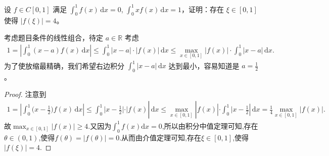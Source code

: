 \documentclass[../../main.tex]{subfiles}%
\begin{document}
\begin{example}
设 $f \in C[0,1]$ 满足 $\int_0^1 f(x) \, \mathrm{d}x = 0$, $\int_0^1 xf(x) \, \mathrm{d}x = 1$，证明：存在 $\xi \in [0,1]$ 使得 $|f(\xi)| = 4$。
\end{example}
\begin{note}
考虑题目条件的线性组合，待定 $a \in \mathbb{R}$ 考虑
\begin{align*}
1 = \left| \int_0^1 (x - a)f(x) \, \mathrm{d}x \right| \leqslant  \int_0^1 |x - a| \cdot |f(x)| \, \mathrm{d}x \leqslant  \max_{x \in [0,1]} |f(x)| \cdot \int_0^1 |x - a| \, \mathrm{d}x.
\end{align*}
为了使放缩最精确，我们希望右边积分 $\int_0^1 |x - a| \, \mathrm{d}x$ 达到最小，容易知道是 $a = \frac{1}{2}$。
\end{note}
\begin{proof}

注意到
\begin{align*}
1=\left| \int_0^1{(x}-\frac{1}{2})f(x)\,\mathrm{d}x \right|\leqslant \int_0^1{|x}-\frac{1}{2}|\cdot |f(x)|\,\mathrm{d}x\leqslant \max_{x\in [0,1]} |f(x)|\cdot \int_0^1{|x}-\frac{1}{2}|\,\mathrm{d}x=\frac{1}{4}\max_{x\in [0,1]} |f(x)|.
\end{align*}
故$\max_{x\in [0,1]} |f(x)|\geqslant 4$.又因为$\int_0^1{f(x) \mathrm{d}x}=0$,所以由积分中值定理可知,存在$\theta \in (0,1)$,使得$f(\theta) =\left| f(\theta) \right|=0$.从而由介值定理可知,存在$\xi \in [0,1]$,使得$\left| f(\xi) \right|=4$.

\end{proof}
\end{document}
